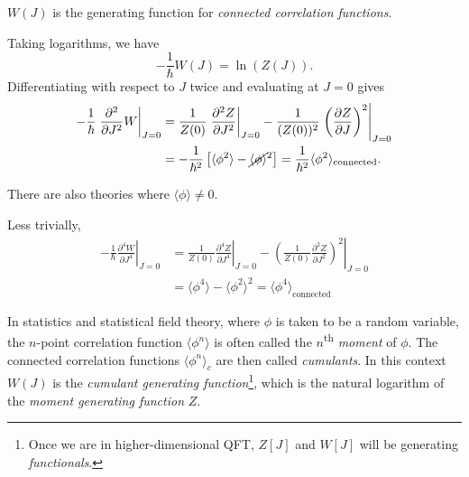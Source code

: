 \begin{claim}
  $W(J)$ is the generating function for \emph{connected correlation functions}.
\end{claim}
\begin{example}[$\langle \phi^2 \rangle$]
  Taking logarithms, we have
  \begin{equation}
    -\frac{1}{\hbar} W(J) = \ln (Z(J)).
  \end{equation}
  Differentiating with respect to $J$  twice and evaluating at $J = 0$ gives
   \begin{align}
     -\frac{1}{\hbar} \left.\frac{\partial^2}{\partial J^2} W \right\rvert_{J = 0} &= \frac{1}{Z(0)} \left.\frac{\partial^2 Z}{\partial J^2}\right\rvert_{J = 0} - \frac{1}{(Z(0))^2} \left.\left( \frac{\partial Z}{\partial J} \right)^2 \right\rvert_{J =0} \\
     &= -\frac{1}{\hbar^2} \left[ \langle \phi^2 \rangle - \cancel{\langle \phi \rangle}^2 \right] = \frac{1}{\hbar^2} \langle \phi^2 \rangle_{\text{connected}}.
  \end{align}
  \begin{leftbar}
    There are also theories where $\langle \phi \rangle \neq 0$.
  \end{leftbar}
\end{example}
\begin{example}[$\langle \phi^4 \rangle$]
  Less trivially, 
  \begin{align}
    -\frac{1}{\hbar} \left. \frac{\partial^4 W}{\partial J^4} \right\rvert_{J = 0} &= \frac{1}{Z(0)} \left. \frac{\partial^4 Z}{\partial J^4}\right\rvert_{J = 0} - \left.\left( \frac{1}{Z(0)} \frac{\partial^2 Z}{\partial J^2} \right)^2 \right\rvert_{J = 0} \\
    &= \langle \phi^4 \rangle - \langle \phi^2 \rangle^2 = \langle \phi^4 \rangle_{\text{connected}} 
  \end{align}
\end{example}

\begin{leftbar}
  \begin{remark}
    In statistics and statistical field theory, where $\phi$ is taken to be a random variable, the $n$-point correlation function $\langle \phi^n \rangle$ is often called the $n$\textsuperscript{th} \emph{moment} of $\phi$.
    The connected correlation functions $\langle \phi^{n} \rangle_c$ are then called \emph{cumulants}. 
    In this context $W(J)$ is the \emph{cumulant generating function}\footnote{Once we are in higher-dimensional QFT, $Z[J]$ and $W[J]$ will be generating \emph{functionals}.}, which is the natural logarithm of the \emph{moment generating function} $Z$.
  \end{remark}
\end{leftbar}

